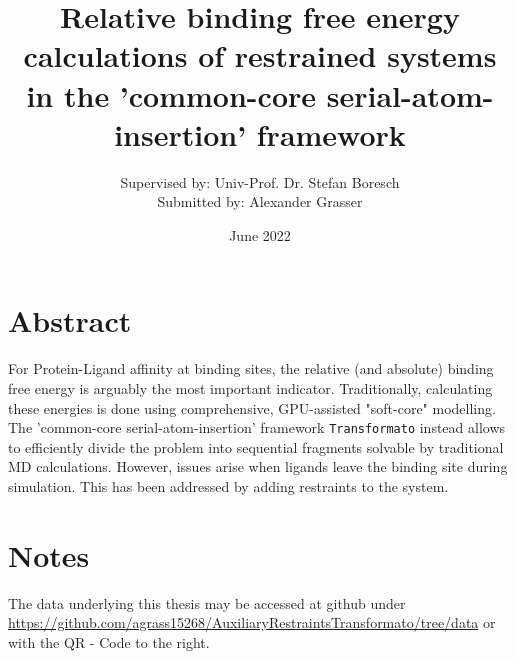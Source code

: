 \documentclass[oneside]{scrreprt}
\title{Relative binding free energy calculations of restrained systems in the 'common-core serial-atom-insertion' framework}
\author{Supervised by: Univ-Prof. Dr. Stefan Boresch\\Submitted by: \hspace{26mm}Alexander Grasser}
\date{June 2022}
\begin{document}
\begin{titlepage}

\maketitle{}
\end{titlepage}
\section*{Abstract}
    
    For Protein-Ligand affinity at binding sites, the relative (and absolute) binding free energy is arguably the most important indicator. Traditionally, calculating these energies is done using comprehensive, GPU-assisted "soft-core" modelling. The 'common-core serial-atom-insertion' framework \texttt{Transformato} instead allows to efficiently divide the problem into sequential fragments solvable by traditional MD calculations. However, issues arise when ligands leave the binding site during simulation. This has been addressed by adding restraints to the system.
\vspace{\fill}
\section*{Notes}
\noindent\begin{minipage}{0.7\textwidth}
The data underlying this thesis may be accessed at github under \url{https://github.com/agrass15268/AuxiliaryRestraintsTransformato/tree/data} or with the QR - Code to the right.
\end{minipage}
\hspace{0.1\textwidth}
\begin{minipage}{0.2\textwidth}

\end{minipage}
\newpage

\begingroup
\let\clearpage\relax
\renewcommand\contentsname{Table of Contents}
\tableofcontents
{}
\endgroup
\renewcommand{\thefootnote}{\Roman{footnote}}
\end{document}
